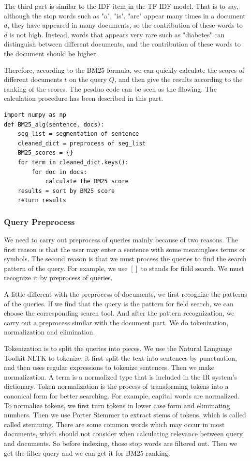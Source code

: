 \documentclass[10pt,journal,compsoc]{IEEEtran}
\begin{document}
The third part is similar to the IDF item in the TF-IDF model. That is to say, although the stop words such as "a", "is", "are" appear many times in a document $d$, they have appeared in many documents, so the contribution of these words to $d$ is not high. Instead, words that appears very rare such as "diabetes" can distinguish between different documents, and the contribution of these words to the document should be higher.

Therefore, according to the BM25 formula, we can quickly calculate the scores of different documents $t$ on the query $Q$, and then give the results according to the ranking of the scores.
The pesduo code can be seen as the fllowing. The calculation procedure has been described in this part.
\begin{lstlisting}
import numpy as np
def BM25_alg(sentence, docs):
    seg_list = segmentation of sentence
    cleaned_dict = preprocess of seg_list
    BM25_scores = {}
    for term in cleaned_dict.keys():
        for doc in docs:
            calculate the BM25 score
    results = sort by BM25 score
    return results
\end{lstlisting}


\subsubsection{Query Preprocess}
We need to carry out preprocess of queries mainly because of two reasons. The first reason is that the user may enter a sentence with some meaningless terms or symbols. The second reason is that we must process the queries to find the search pattern of the query. For example, we use $[]$ to stands for field search. We must recognize it by preprocess of queries.

A little different with the preprocess of documents, we first recognize the patterns of the queries. If we find that the query is the pattern for field search, we can choose the corresponding search tool. And after the pattern recognization, we carry out a preprocess similar with the document part. We do tokenization, normalization and elimination.

Tokenization is to split the queries into pieces. We use the Natural Language Toolkit NLTK to tokenize, it first split the text into sentences by punctuation, and then uses regular expressions to tokenize sentences. 
Then we make normalization. A term is a normalized type that is included in the IR system's dictionary. Token normalization is the process of transforming tokens into a canonical form for better searching. For example, capital words are normalized. To normalize tokens, we first turn tokens in lower case form and eliminating numbers. Then we use Porter Stemmer to extract stems of tokens, which is called called stemming.
There are some common words which may occur in most documents, which should not consider when calculating relevance between query and documents. So before indexing, those stop words are filtered out.
Then we get the filter query and we can get it for BM25 ranking.
\end{document}
